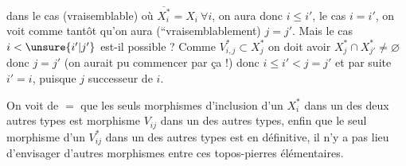 dans le cas (vraisemblable) où $\overline{X_i^*}=X_i\ \forall i$, on aura donc $i\leq i'$,  le cas $i=i'$, on voit comme tantôt qu'on aura (``vraisemblablement) $j=j'$. Mais le cas $i<\unsure{i'|j'}$ est-il possible ? Comme $V_{i,j}^*\subset X_j^*$  on doit avoir $X_j^*\cap X_{j'}^*\ne\varnothing$ donc $j=j'$ (on aurait pu commencer par ça !)
donc  $i\leq i'<j=j'$ et par suite $i'=i$, puisque $j$ successeur de $i$.

On voit de $=$ que les seuls morphismes d'inclusion d'un $X_i^*$ dans un des deux autres types est
  morphisme  $V_{ij}$ dans un des autres types,  enfin que le seul morphisme d'un $V_{ij}^*$ dans un des autres types est
en définitive, il n'y a pas lieu d'envisager d'autres morphismes entre ces  topos-pierres élémentaires.
